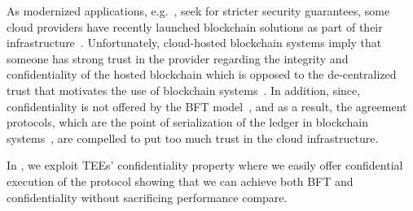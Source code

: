  As modernized applications, e.g.~\cite{10.1093/jamia/ocx068}, seek for stricter security guarantees, some cloud providers have recently launched blockchain solutions as part of their infrastructure~\cite{}. Unfortunately, cloud-hosted blockchain systems imply that someone has strong trust in the provider regarding the integrity and confidentiality of the hosted blockchain which is opposed to the de-centralized trust that motivates the use of blockchain systems~\cite{10.1145/3528535.3531516}. In addition, since, confidentiality is not offered by the BFT model~\cite{ciad}, and as a result, the agreement protocols, which are the point of serialization of the ledger in blockchain systems~\cite{}, are compelled to put too much trust in the cloud infrastructure. 

In \projecttitle{}, we exploit TEEs' confidentiality property where we easily offer confidential execution of the protocol showing that we can achieve both BFT and confidentiality without sacrificing performance compare.
\fi




%